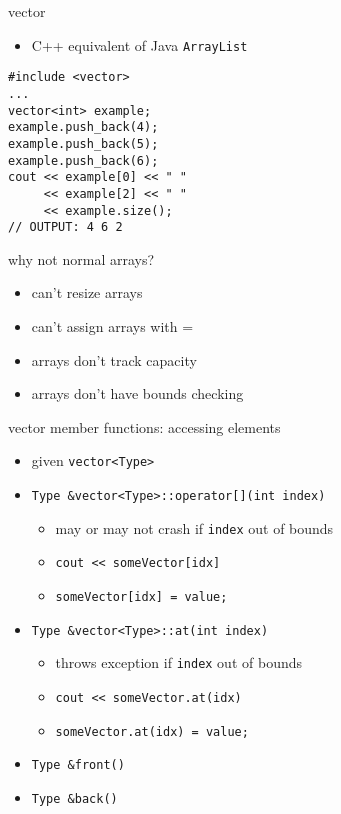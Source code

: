 \begin{frame}[fragile,label=vectorIntro]{vector}
\lstset{language=C++,style=small}
\begin{itemize}
\item C++ equivalent of Java \texttt{ArrayList}
\end{itemize}
\begin{lstlisting}
#include <vector>
...
vector<int> example;
example.push_back(4);
example.push_back(5);
example.push_back(6);
cout << example[0] << " "
     << example[2] << " "
     << example.size();
// OUTPUT: 4 6 2
\end{lstlisting}
\end{frame}

\begin{frame}{why not normal arrays?}
\begin{itemize}
\item can't resize arrays
\item can't assign arrays with =
\item arrays don't track capacity
\item arrays don't have bounds checking
\end{itemize}
\end{frame}

\begin{frame}[fragile,label=vectMeth]{vector member functions: accessing elements}
\lstset{
    language=C++,
    style=small
}
\begin{itemize}
\item given \lstinline|vector<Type>|
\item \lstinline|Type &vector<Type>::operator[](int index)|
    \begin{itemize}
    \item may or may not crash if \lstinline|index| out of bounds
    \item \lstinline|cout << someVector[idx]|
    \item \lstinline|someVector[idx] = value;|
    \end{itemize}
\item \lstinline|Type &vector<Type>::at(int index)|
    \begin{itemize}
        \item throws exception if \lstinline|index| out of bounds
        \item \lstinline|cout << someVector.at(idx)|
        \item \lstinline|someVector.at(idx) = value;|
    \end{itemize}
\item \lstinline|Type &front()|
\item \lstinline|Type &back()|
\end{itemize}
\end{frame}

